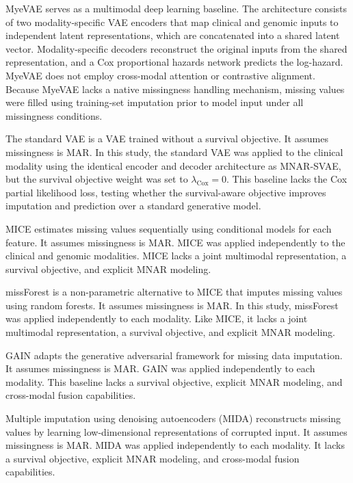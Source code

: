 \documentclass[final,3p,times,authoryear]{elsarticle}
\begin{document}
MyeVAE \citep{chang2025myevae} serves as a multimodal deep learning baseline. The architecture consists of two modality-specific VAE encoders that map clinical and genomic inputs to independent latent representations, which are concatenated into a shared latent vector. Modality-specific decoders reconstruct the original inputs from the shared representation, and a Cox proportional hazards network predicts the log-hazard. MyeVAE does not employ cross-modal attention or contrastive alignment. Because MyeVAE lacks a native missingness handling mechanism, missing values were filled using training-set imputation prior to model input under all missingness conditions.

The standard VAE \citep{kingma2014auto} is a VAE trained without a survival objective. It assumes missingness is MAR. In this study, the standard VAE was applied to the clinical modality using the identical encoder and decoder architecture as MNAR-SVAE, but the survival objective weight was set to $\lambda_{\text{Cox}} = 0$. This baseline lacks the Cox partial likelihood loss, testing whether the survival-aware objective improves imputation and prediction over a standard generative model.

MICE \citep{buuren2011mice} estimates missing values sequentially using conditional models for each feature. It assumes missingness is MAR. MICE was applied independently to the clinical and genomic modalities. MICE lacks a joint multimodal representation, a survival objective, and explicit MNAR modeling.

missForest \citep{stekhoven2012missforest} is a non-parametric alternative to MICE that imputes missing values using random forests. It assumes missingness is MAR. In this study, missForest was applied independently to each modality. Like MICE, it lacks a joint multimodal representation, a survival objective, and explicit MNAR modeling.

GAIN \citep{yoon2018gain} adapts the generative adversarial framework for missing data imputation. It assumes missingness is MAR. GAIN was applied independently to each modality. This baseline lacks a survival objective, explicit MNAR modeling, and cross-modal fusion capabilities.

Multiple imputation using denoising autoencoders (MIDA) \citep{gondara2018mida} reconstructs missing values by learning low-dimensional representations of corrupted input. It assumes missingness is MAR. MIDA was applied independently to each modality. It lacks a survival objective, explicit MNAR modeling, and cross-modal fusion capabilities.
\end{document}
